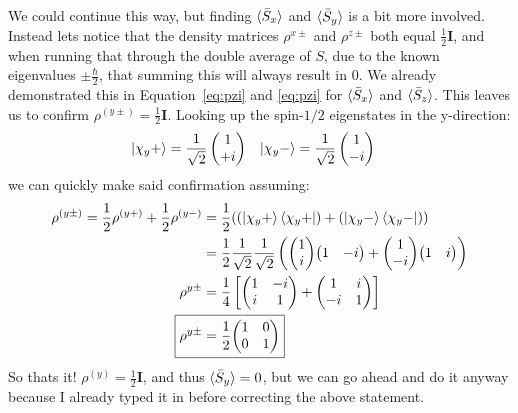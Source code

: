 \documentclass{jhwhw}
\begin{document}
We could continue this way, but finding $\braket{\bar{S}_x}$ and $\braket{\bar{S}_y}$ is a bit more involved.  Instead lets notice that the density matrices $\rho^{x\pm}$ and $\rho^{z\pm}$ both equal $\frac{1}{2}\mathbf{I}$, and when running that through the double average of $S$, due to the known eigenvalues $\pm\frac{\hbar}{2}$, that summing this will always result in 0.  We already demonstrated this in Equation~\eqref{eq:pzi} and \eqref{eq:pzi} for $\braket{\bar{S}_x}$ and $\braket{\bar{S}_z}$.  This leaves us to confirm $\rho^{(y\pm)}= \frac{1}{2}\mathbf{I}$.  Looking up the spin-$1/2$ eigenstates in the y-direction\cite{mc}:
\begin{align}
    \ket{\chi_y +} &=
    \frac{1}{\sqrt{2}}
	\begin{pmatrix}
		1 \\
		+i
	\end{pmatrix}
    &
    \ket{\chi_y -} &=
    \frac{1}{\sqrt{2}}
	\begin{pmatrix}
		1 \\
		-i
	\end{pmatrix}
\end{align}
we can quickly make said confirmation assuming:
\begin{align}
	\rho^{(y\pm)} 
	= 
	\frac{1}{2}\rho^{(y+)} + \frac{1}{2}\rho^{(y-)} &= \frac{1}{2}(( \ket{\chi_y+}\bra{\chi_y+}) + (\ket{\chi_y-}\bra{\chi_y-} )) 
	\\
	&=
	\frac{1}{2}
	\frac{1}{\sqrt{2}}
	\frac{1}{\sqrt{2}}
	\left(
	{\begin{pmatrix}
		1	\\
		i
	\end{pmatrix}}
	{\begin{pmatrix}
		1	&	-i
	\end{pmatrix}}
	+
	{\begin{pmatrix}
		1	\\
		-i
	\end{pmatrix}}
	{\begin{pmatrix}
		1	&	i
	\end{pmatrix}}
	\right)
	\\
	\rho^{y\pm}
	&=
	\frac{1}{4}
	\left[
	{\begin{pmatrix}
		1	&	-i	\\
		i	&	1
	\end{pmatrix}}
	+
	{\begin{pmatrix}
		1	&	i	\\
		-i	&	1
	\end{pmatrix}}
	\right]
	\\
	\Aboxed{\rho^{y\pm}
	&=
	\frac{1}{2}
	{\begin{pmatrix}
		1	&	0	\\
		0	&	1
	\end{pmatrix}}
	\label{eq:pyi}}
\end{align}
So thats it! $\rho^{(y)}=\frac{1}{2}\mathbf{I}$, and thus $\braket{\bar{S}_y} = 0$, but we can go ahead and do it anyway because I already typed it in before correcting the above statement.  
\end{document}
